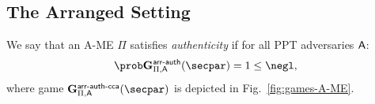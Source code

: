 \subsection{The Arranged Setting}
\begin{definition}[Authenticity of A-ME]\label{def:ame_auth}
    We say that an A-ME $\Pi$ satisfies {\em authenticity} if for all PPT adversaries $\mathsf{A}$:
    \[
        \Prob{\NISHeufgame{\arranged}_{\Pi,\adversary}(\secpar) = 1} \leq \negl,
    \]
    where game $\NISHeufgamecca{\arranged}_{\Pi, \adversary}(\secpar)$ is depicted in Fig.~\ref{fig:games-A-ME}.
\end{definition}